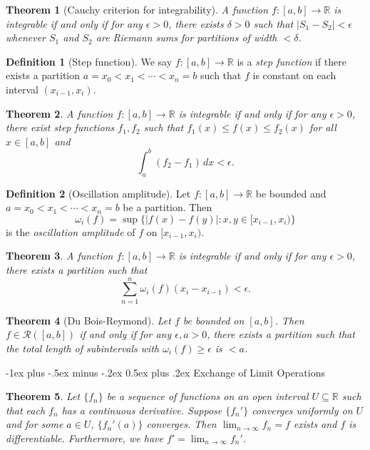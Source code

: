 \documentclass[10pt,landscape]{article}
\makeatletter
\newtheorem{theorem}{Theorem}
\theoremstyle{definition}
\newtheorem{definition}{Definition}
\newcommand{\R}{\mathbb{R}}
\renewcommand{\section}{\@startsection{section}{1}{0mm}%
                                {-1ex plus -.5ex minus -.2ex}%
                                {0.5ex plus .2ex}%
                                {\normalfont\large\bfseries}}
\makeatother
\begin{document}
\begin{multicols}{3}
\begin{theorem}[Cauchy criterion for integrability]
  A function $f : [a, b] \to \R$ is integrable if
  and only if for any $\epsilon > 0$, there exists
  $\delta > 0$ such that $|S_1 - S_2| < \epsilon$
  whenever $S_1$ and $S_2$ are Riemann sums for
  partitions of width $< \delta$.
\end{theorem}

\begin{definition}[Step function]
  We say $f : [a, b] \to \R$ is a \emph{step function}
  if there exists a partition $a = x_0 < x_1 < \cdots < x_n = b$
  such that $f$ is constant on each interval $(x_{i - 1}, x_i)$.
\end{definition}

\begin{theorem}
  A function $f : [a, b] \to \R$ is integrable if and
  only if for any $\epsilon > 0$, there exist
  step functions $f_1, f_2$ such that
  $f_1(x) \le f(x) \le f_2(x)$ for all $x \in [a, b]$ and
  \[
    \int_a^b (f_2 - f_1)\, dx < \epsilon.
  \]
\end{theorem}

\begin{definition}[Oscillation amplitude]
  Let $f : [a, b] \to \R$ be bounded and
  $a = x_0 < x_1 < \cdots < x_n = b$ be a partition.
  Then
  \[
    \omega_i(f) = \sup\{|f(x) - f(y)| : x, y \in [x_{i - 1}, x_i)\}
  \]
  is the \emph{oscillation amplitude} of $f$ on $[x_{i - 1}, x_i)$.
\end{definition}

\begin{theorem}
  A function $f : [a, b] \to \R$ is integrable if and
  only if for any $\epsilon > 0$, there exists
  a partition such that
  \[
    \sum_{n = 1}^n \omega_i(f) (x_i - x_{i - 1}) < \epsilon.
  \]
\end{theorem}

\begin{theorem}[Du Bois-Reymond]
  Let $f$ be bounded on $[a, b]$. Then $f \in \mathcal{R}([a, b])$ 
  if and only if for any $\epsilon, a > 0$, there
  exists a partition such that the total length of
  subintervals with $\omega_i(f) \ge \epsilon$ is $< a$.
\end{theorem}

\section{Exchange of Limit Operations}

\begin{theorem}
  Let $\{f_n\}$ be a sequence of functions on an
  open interval $U \subseteq \R$ such that
  each $f_n$ has a continuous derivative. Suppose
  $\{f_n'\}$ converges uniformly on $U$ and for some
  $a \in U$, $\{f_n'(a)\}$ converges. Then
  $\lim_{n \to \infty} f_n = f$ exists and
  $f$ is differentiable. Furthermore, we have
  $f' = \lim_{n \to \infty} f_n'$.
\end{theorem}


\end{multicols}
\end{document}
